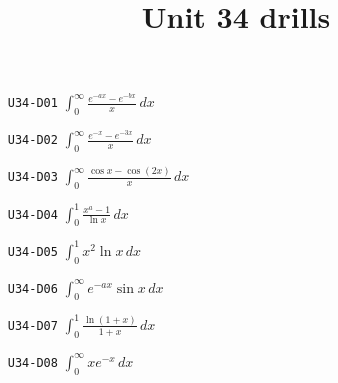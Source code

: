 \title{Unit 34 drills}\maketitle\begin{enumerate}
  \item[\texttt{U34-D01}] $\displaystyle \int_{0}^{\infty}\frac{e^{-ax}-e^{-bx}}{x}\,dx$
  \item[\texttt{U34-D02}] $\displaystyle \int_{0}^{\infty}\frac{e^{-x}-e^{-3x}}{x}\,dx$
  \item[\texttt{U34-D03}] $\displaystyle \int_{0}^{\infty}\frac{\cos x-\cos(2x)}{x}\,dx$
  \item[\texttt{U34-D04}] $\displaystyle \int_{0}^{1}\frac{x^{a}-1}{\ln x}\,dx$
  \item[\texttt{U34-D05}] $\displaystyle \int_{0}^{1}x^{2}\ln x\,dx$
  \item[\texttt{U34-D06}] $\displaystyle \int_{0}^{\infty}e^{-ax}\sin x\,dx$
  \item[\texttt{U34-D07}] $\displaystyle \int_{0}^{1}\frac{\ln(1+x)}{1+x}\,dx$
  \item[\texttt{U34-D08}] $\displaystyle \int_{0}^{\infty}x e^{-x}\,dx$
\end{enumerate}
